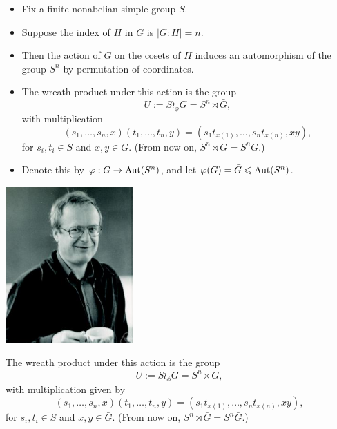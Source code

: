 \documentclass[xcolor=dvipsnames,11pt,hide notes]{beamer}
\theoremstyle{definition}
\theoremstyle{remark}
\numberwithin{theorem}{section}
\numberwithin{claim}{section}
\numberwithin{equation}{section}
\numberwithin{conjecture}{section}
\begin{document}
\begin{frame}[label=IEPropsLemma2Alt]{}
  \begin{itemize}
  \item Fix a finite nonabelian simple group $S$. 
\vskip2mm
\item Suppose the index of $H$ in $G$ is $|G:H| = n$.
\vskip2mm
\item Then the action of $G$ on the cosets of $H$ induces an automorphism of the
group $S^n$ by permutation of coordinates.  
\vskip2mm
\item  The wreath product under this action is the group
  \[
  U := S\wr_\phi G =  S^n \rtimes \bar{G}, %
  \]
  with multiplication
  \[
  (s_1, \dots, s_n, x) (t_1, \dots, t_n, y) = 
  (s_1 t_{x(1)}, \dots, s_nt_{x(n)}, x y),
  \]
  for $s_i, t_i \in S$ and $x, y \in \bar{G}$.
  (From now on, $S^n \rtimes \bar{G} = S^n\bar{G}$.)
\item Denote this by  $\varphi: G \rightarrow \mathrm{Aut}(S^n)$, 
  and let $\varphi(G) = \bar{G} \leqslant \mathrm{Aut}(S^n)$.  
  \end{itemize}
\end{frame}


\begin{frame}[fragile,label=IEPropsLemma2Prezi]{}
  \begin{center}
\includegraphics[height=6cm]{images/Kurzweil-crop}
  \end{center}
\end{frame}


\begin{frame}[label=IEPropsLemma2Wreath]{}
  The wreath product under this action is the group
  \[
  U := S\wr_\phi G =  S^n \rtimes \bar{G}, %
  \]
  with multiplication given by
  \[
  (s_1, \dots, s_n, x) (t_1, \dots, t_n, y) = 
  (s_1 t_{x(1)}, \dots, s_nt_{x(n)}, x y),
  \]
  for $s_i, t_i \in S$ and $x, y \in \bar{G}$.
  (From now on, $S^n \rtimes \bar{G} = S^n\bar{G}$.)
\end{frame}
\end{document}
